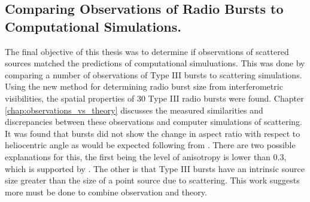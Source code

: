 \subsection{Comparing Observations of Radio Bursts to Computational Simulations.}
The final objective of this thesis was to determine if observations of scattered sources matched the predictions of computational simuluations. This was done by comparing a number of observations of Type III bursts to scattering simulations.
Using the new method for determining radio burst size from interferometric visibilities, the spatial properties of 30 Type III radio bursts were found. Chapter \ref{chap:observations_vs_theory} discusses the measured similarities and discrepancies between these observations and computer simulations of scattering. It was found that bursts did not show the change in aspect ratio with respect to heliocentric angle as would be expected following from \cite{Kontar2019}. There are two possible explanations for this, the first being the level of anisotropy is lower than 0.3, which is supported by \cite{Zhang2021}. The other is that Type III bursts have an intrinsic source size greater than the size of a point source due to scattering. This work suggests more must be done to combine observation and theory.

